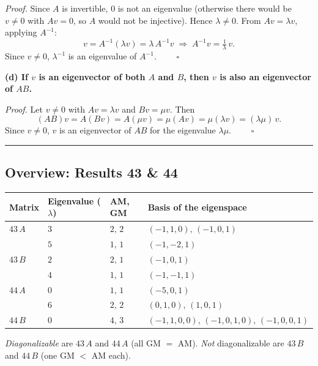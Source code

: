 \documentclass[a4paper,12pt]{article}
\begin{document}
\textit{Proof.} Since $A$ is invertible, $0$ is not an eigenvalue (otherwise there would be $v \neq 0$ with $Av = 0$, so $A$ would not be injective). Hence $\lambda \neq 0$. From $Av = \lambda v$, applying $A^{-1}$:
\[
v = A^{-1}(\lambda v) = \lambda\, A^{-1} v \;\Longrightarrow\; A^{-1} v = \tfrac{1}{\lambda}\, v.
\]
Since $v \neq 0$, $\lambda^{-1}$ is an eigenvalue of $A^{-1}$. $\qquad\square$

\textbf{(d) If $v$ is an eigenvector of both $A$ and $B$, then $v$ is also an eigenvector of $AB$.}

\textit{Proof.} Let $v \neq 0$ with $Av = \lambda v$ and $Bv = \mu v$. Then
\[
(AB)v = A(Bv) = A(\mu v) = \mu (Av) = \mu (\lambda v) = (\lambda\mu)\,v.
\]
Since $v \neq 0$, $v$ is an eigenvector of $AB$ for the eigenvalue $\lambda\mu$. $\qquad\square$

\bigskip
\hrule
\bigskip

\subsection*{Overview: Results 43 \& 44}

\begin{center}
\begin{tabular}{@{}llll@{}}
\toprule
Matrix & Eigenvalue ($\lambda$) & AM, GM & Basis of the eigenspace \\
\midrule
$43\,A$ & $3$ & $2,\,2$ & $(-1,1,0),\,(-1,0,1)$ \\
        & $5$ & $1,\,1$ & $(-1,-2,1)$ \\[2pt]
$43\,B$ & $2$ & $2,\,1$ & $(-1,0,1)$ \\
        & $4$ & $1,\,1$ & $(-1,-1,1)$ \\[2pt]
$44\,A$ & $0$ & $1,\,1$ & $(-5,0,1)$ \\
        & $6$ & $2,\,2$ & $(0,1,0),\,(1,0,1)$ \\[2pt]
$44\,B$ & $0$ & $4,\,3$ & $(-1,1,0,0),\,(-1,0,1,0),\,(-1,0,0,1)$ \\
\bottomrule
\end{tabular}
\end{center}

\textit{Diagonalizable} are $43\,A$ and $44\,A$ (all GM $=$ AM). \emph{Not} diagonalizable are $43\,B$ and $44\,B$ (one GM $<$ AM each).
\end{document}
